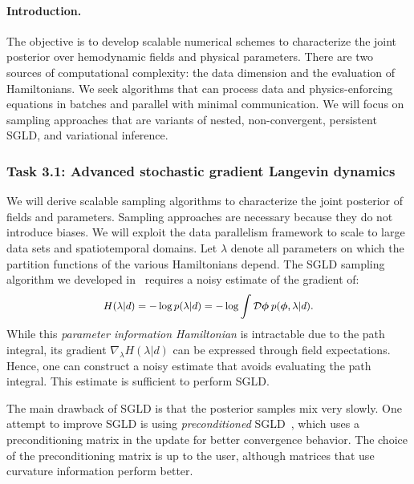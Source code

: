 \paragraph{Introduction.}
The objective is to develop scalable numerical schemes to characterize the joint posterior over hemodynamic fields and physical parameters. There are two sources of computational complexity: the data dimension and the evaluation of Hamiltonians. We seek algorithms that can process data and physics-enforcing equations in batches and parallel with minimal communication. We will focus on sampling approaches that are variants of nested, non-convergent, persistent SGLD, and variational inference. 

\subsubsection*{Task 3.1: Advanced stochastic gradient Langevin dynamics}
We will derive scalable sampling algorithms to characterize the joint posterior of fields and parameters.
Sampling approaches are necessary because they do not introduce biases.
We will exploit the data parallelism framework to scale to large data sets and spatiotemporal domains.
Let $\lambda$ denote all parameters on which the partition functions of the various Hamiltonians depend.
The SGLD sampling algorithm we developed in~\cite{alberts2023physics} requires a noisy estimate of the gradient of:
$$
\small
H(\lambda|d) = -\log p(\lambda | d) = -\log \int \mathcal{D}\boldsymbol{\phi} \: p(\boldsymbol{\phi},\lambda |d).
$$
While this \emph{parameter information Hamiltonian} is intractable due to the path integral, its gradient $\nabla_{\lambda}H(\lambda |d)$ can be expressed through field expectations.
Hence, one can construct a noisy estimate that avoids evaluating the path integral.
This estimate is sufficient to perform SGLD.

The main drawback of SGLD is that the posterior samples mix very slowly.
One attempt to improve SGLD is using \emph{preconditioned} SGLD~\cite{li2016preconditioned}, which uses a preconditioning matrix in the update for better convergence behavior.
The choice of the preconditioning matrix is up to the user, although matrices that use curvature information perform better.


